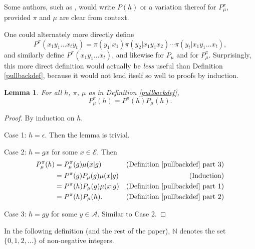 \documentclass[twoside]{article}
\newtheorem{lemma}[theorem]{Lemma}
\begin{document}
Some authors, such as \cite{hutter2009discrete}, would write $P(h)$ or a variation thereof
for $P^\pi_\mu$, provided $\pi$ and $\mu$ are clear from context.

One could alternately more directly define
\[
    P^\pi(x_1y_1\ldots x_ty_t)
    = \pi(y_1|x_1)\pi(y_2|x_1y_1x_2)\cdots \pi(y_t|x_1y_1\ldots x_t),
\]
and similarly define $P^\pi(x_1y_1\ldots x_t)$,
and likewise for $P_\mu$ and for $P^\pi_\mu$. Surprisingly, this more
direct definition would actually be \emph{less} useful than
Definition \ref{pullbackdef}, because it would not lend itself so well
to proofs by induction.

\begin{lemma}
\label{factorizationlemma}
    For all $h$, $\pi$, $\mu$ as in Definition \ref{pullbackdef},
    \[
        P^\pi_\mu(h) = P^\pi(h)P_\mu(h).
    \]
\end{lemma}

\begin{proof}
    By induction on $h$.

    Case 1: $h=\epsilon$. Then the lemma is trivial.

    Case 2: $h=gx$ for some $x\in\mathcal E$.
        Then
        \begin{align*}
            P^\pi_\mu(h)
                &= P^\pi_\mu(g)\mu(x|g)
                    &\mbox{(Definition \ref{pullbackdef} part 3)}\\
                &= P^\pi(g)P_\mu(g)\mu(x|g)
                    &\mbox{(Induction)}\\
                &= P^\pi(h)P_\mu(g)\mu(x|g)
                    &\mbox{(Definition \ref{pullbackdef} part 1)}\\
                &= P^\pi(h)P_\mu(h).
                    &\mbox{(Definition \ref{pullbackdef} part 2)}
        \end{align*}

    Case 3: $h=gy$ for some $y\in\mathcal A$.
        Similar to Case 2.
\end{proof}

In the following definition (and the rest of the paper),
$\mathbb N$ denotes the set $\{0,1,2,\ldots\}$ of non-negative
integers.
\end{document}
